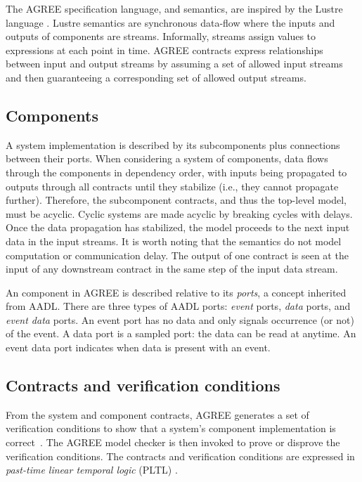 
\newcommand{\globally}{\konst{Always}}
\newcommand{\historically}{\konst{Hist}}
\newcommand{\assumes}{\ensuremath{A}}
\newcommand{\guarantees}{\ensuremath{P}}
\newcommand{\inputs}{\ensuremath{I}}
\newcommand{\outputs}{\ensuremath{O}}
\newcommand{\components}{\ensuremath{C}}
\newcommand{\component}{\ensuremath{c}}

The AGREE specification language, and semantics, are inspired by the
Lustre language \cite{10.1145/41625.41641}. Lustre semantics are
synchronous data-flow where the inputs and outputs of components are
streams.  Informally, streams assign values to expressions at each
point in time.  AGREE contracts express relationships between input
and output streams by assuming a set of allowed input streams and then
guaranteeing a corresponding set of allowed output streams.

\subsection{Components}
A system implementation is described by its subcomponents plus
connections between their ports.  When considering a system of
components, data flows through the components in dependency order,
with inputs being propagated to outputs through all contracts until
they stabilize (i.e., they cannot propagate further). Therefore, the
subcomponent contracts, and thus the top-level model, must be acyclic.
Cyclic systems are made acyclic by breaking cycles with delays.  Once
the data propagation has stabilized, the model proceeds to the next
input data in the input streams. It is worth noting that the semantics
do not model computation or communication delay. The output of one
contract is seen at the input of any downstream contract in the same
step of the input data stream.

An component in AGREE is described relative to its \emph{ports}, a
concept inherited from AADL.  There are three types of AADL ports:
\emph{event} ports, \emph{data} ports, and \emph{event data} ports.
An event port has no data and only signals occurrence (or not) of the
event. A data port is a sampled port: the data can be read at anytime.
An event data port indicates when data is present with an event.

\subsection{Contracts and verification conditions}

From the system and component contracts, AGREE generates a set of
verification conditions to show that a system's component
implementation is correct~\cite{agree2013}.  The AGREE model checker
is then invoked to prove or disprove the verification
conditions. The contracts and verification conditions are expressed in
\emph{past-time linear temporal logic} (PLTL) \cite{10.1093/jigpal/8.1.55}.

